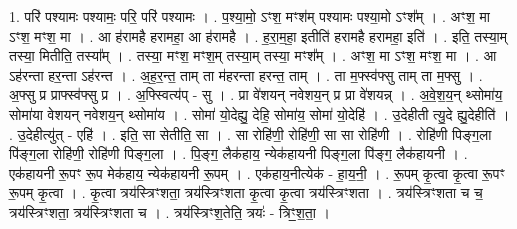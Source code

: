 \documentclass[17pt]{extarticle}
\begin{document}
1. परि॑ पश्यामः पश्यामः॒ परि॒ परि॑ पश्यामः । . प॒श्या॒मो॒ ऽꣳश॒ मꣳश॑म् पश्यामः पश्या॒मो ऽꣳश᳚म् । . अꣳश॒ मा ऽꣳश॒ मꣳश॒ मा । . आ ह॑रामहै हरामहा॒ आ ह॑रामहै । . ह॒रा॒म॒हा॒ इतीति॑ हरामहै हरामहा॒ इति॑ । . इति॒ तस्या॒म् तस्या॒ मितीति॒ तस्या᳚म् । . तस्या॒ मꣳश॒ मꣳश॒म् तस्या॒म् तस्या॒ मꣳश᳚म् । . अꣳश॒ मा ऽꣳश॒ मꣳश॒ मा । . आ ऽह॑रन्ता हर॒न्ता ऽह॑रन्त । . अ॒ह॒र॒न्त॒ ताम् ता म॑हरन्ता हरन्त॒ ताम् । . ता म॒फ्स्व॑फ्सु ताम् ता म॒फ्सु । . अ॒फ्सु प्र प्राफ्स्व॑फ्सु प्र । . अ॒फ्स्वित्य॑प् - सु । . प्रा वे॑शयन् नवेशय॒न् प्र प्रा वे॑शयन्न् । . अ॒वे॒श॒य॒न् थ्सोमा॑य॒ सोमा॑या वेशयन् नवेशय॒न् थ्सोमा॑य । . सोमा॑ यो॒देह्यु॒ देहि॒ सोमा॑य॒ सोमा॑ यो॒देहि॑ । . उ॒देहीती त्यु॒दे ह्यु॒देहीति॑ । . उ॒देहीत्यु॑त् - एहि॑ । . इति॒ सा सेतीति॒ सा । . सा रोहि॑णी॒ रोहि॑णी॒ सा सा रोहि॑णी । . रोहि॑णी पिङ्ग॒ला पि॑ङ्ग॒ला रोहि॑णी॒ रोहि॑णी पिङ्ग॒ला । . पि॒ङ्ग॒ लैक॑हाय॒ न्येक॑हायनी पिङ्ग॒ला पि॑ङ्ग॒ लैक॑हायनी । . एक॑हायनी रू॒पꣳ रू॒प मेक॑हाय॒ न्येक॑हायनी रू॒पम् । . एक॑हाय॒नीत्येक॑ - हा॒य॒नी॒ । . रू॒पम् कृ॒त्वा कृ॒त्वा रू॒पꣳ रू॒पम् कृ॒त्वा । . कृ॒त्वा त्रय॑स्त्रिꣳशता॒ त्रय॑स्त्रिꣳशता कृ॒त्वा कृ॒त्वा त्रय॑स्त्रिꣳशता । . त्रय॑स्त्रिꣳशता च च॒ त्रय॑स्त्रिꣳशता॒ त्रय॑स्त्रिꣳशता च । . त्रय॑स्त्रिꣳश॒तेति॒ त्रयः॑ - त्रिꣳ॒॒श॒ता॒ । \newline
\end{document}
